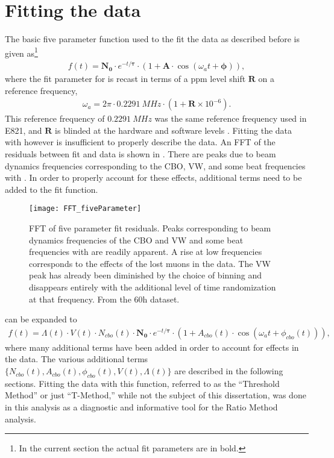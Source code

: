 \section{Fitting the data}
\label{sec:Fitting}


The basic five parameter function used to the fit the data as described before is given as\footnote{In the current section the actual fit parameters are in bold.}
    \begin{align}
        f(t) = \boldsymbol{N_{0}} \cdot e^{-t/\boldsymbol{\tau}} \cdot (1 + \boldsymbol{A} \cdot \cos(\omega_{a}t + \boldsymbol{\phi})),
    \label{eq:fiveparfuncagain}
    \end{align}
where the fit parameter for \wa is recast in terms of a ppm level shift $\boldsymbol{R}$ on a reference frequency,
    \begin{align}
        \omega_{a} = 2 \pi \cdot \SI{0.2291}{MHz} \cdot (1 + \boldsymbol{R} \times 10^{-6}).
    \label{eq:wablind}
    \end{align}
This reference frequency of $\SI{0.2291}{MHz}$ was the same reference frequency used in E821, and $\boldsymbol{R}$ is blinded at the hardware and software levels \cite{ClockManual,SoftwareBlinding}. Fitting the data with  however is insufficient to properly describe the data. An FFT of the residuals between fit and data is shown in . There are peaks due to beam dynamics frequencies corresponding to the CBO, VW, and some beat frequencies with \wa. In order to properly account for these effects, additional terms need to be added to the fit function. 


\begin{figure}
    \centering
    \texttt{[image: FFT\_fiveParameter]}
    \caption[FFT of five parameter fit residuals]{FFT of five parameter fit residuals. Peaks corresponding to beam dynamics frequencies of the CBO and VW and some beat frequencies with \wa are readily apparent. A rise at low frequencies corresponds to the effects of the lost muons in the data. The VW peak has already been diminished by the choice of binning and disappears entirely with the additional level of time randomization at that frequency. From the 60h dataset.}
    \label{fig:FFT_fiveParameter}
\end{figure}


 can be expanded to 
    \begin{align}
        f(t) = \Lambda(t) \cdot V(t) \cdot N_{cbo}(t) \cdot \boldsymbol{N_{0}} \cdot e^{-t/\boldsymbol{\tau}} \cdot (1 + A_{cbo}(t) \cdot \cos(\omega_{a}t + \phi_{cbo}(t))),
    \label{eq:TmethodFunction}
    \end{align}
where many additional terms have been added in order to account for effects in the data. The various additional terms $\{N_{cbo}(t), A_{cbo}(t), \phi_{cbo}(t), V(t), \Lambda(t)\}$ are described in the following sections. Fitting the data with this function, referred to as the ``Threshold Method'' or just ``T-Method,'' while not the subject of this dissertation, was done in this analysis as a diagnostic and informative tool for the Ratio Method analysis. 


